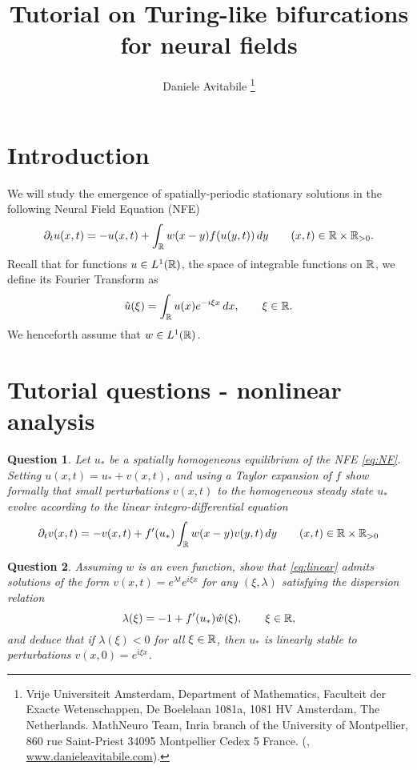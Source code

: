\documentclass[a4paper]{siamonline220329}
\title{Tutorial on Turing-like bifurcations for neural fields}
\author{%
  Daniele Avitabile%
  \thanks{%
    Vrije Universiteit Amsterdam,
    Department of Mathematics,
    Faculteit der Exacte Wetenschappen,
    De Boelelaan 1081a,
    1081 HV Amsterdam, The Netherlands.
  \protect
    MathNeuro Team,
    Inria branch of the University of Montpellier,
    860 rue Saint-Priest
    34095 Montpellier Cedex 5
    France.
  \protect
    (\email{d.avitabile@vu.nl}, \url{www.danieleavitabile.com}).
  }
}
\theoremstyle{plain}
\newtheorem{question}{Question}
\begin{document}
\maketitle
{}

\section{Introduction}\label{sec:intro} 
We will study the emergence of spatially-periodic stationary solutions in the
following Neural Field Equation (NFE)
\begin{equation}\label{eq:NF}
  \partial_{t}u(x,t) = -u(x,t) + \int_{\RSet}w(x-y)f(u(y,t)) \,d y \qquad (x,t) \in
  \RSet \times \RSet_{>0}.
\end{equation}
Recall that for functions $u \in L^1(\mathbb{R})$, the space of integrable functions on
$\mathbb{R}$, we define its Fourier Transform as
\[
  \hat u(\xi) = \int_{\mathbb{R}} u(x) e^{-i\xi x} \,d x, \qquad \xi \in \mathbb{R}.
\]
We henceforth assume that $w \in L^1(\mathbb{R})$.

\section{Tutorial questions - nonlinear analysis}\label{sec:questions} 
\begin{question}\label{question:linearisation}
Let $u_*$ be a spatially homogeneous equilibrium
of the NFE \cref{eq:NF}. Setting $u(x,t) = u_* + v(x,t)$, and using a Taylor
expansion of $f$ show formally that small perturbations $v(x,t)$ to the homogeneous
steady state $u_*$ evolve according to the linear integro-differential equation
\begin{equation}\label{eq:linear}
  \partial_{t}v(x,t) = -v(x,t) + f'(u_*)\int_{\RSet}w(x-y)v(y,t) \,d y \qquad (x,t) \in \RSet \times \RSet_{>0}
\end{equation}
\end{question}

\begin{question}\label{eq:eigenvalues}
  Assuming $w$ is an even function, show that \cref{eq:linear} admits solutions of the form $v(x,t) = e^{\lambda t}
  e^{i\xi x}$ for any $(\xi,\lambda)$ satisfying the \textit{dispersion relation}
  \[
    \lambda(\xi) = -1 + f'(u_*) \hat w(\xi), \qquad \xi \in \mathbb{R},
  \]
  and deduce that if $\lambda(\xi) < 0$ for all $\xi \in \mathbb{R}$, then $u_*$ is
  linearly stable to perturbations $v(x,0) = e^{i\xi x}$.
\end{question}
\end{document}
